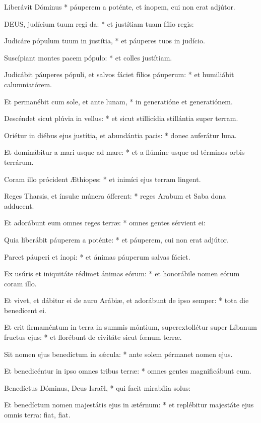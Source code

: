
 Liberávit Dóminus * páuperem a poténte, et ínopem, cui non erat adjútor.


\lettrine[lines=2]{D}{EUS}, judícium tuum regi da: * et justítiam tuam fílio regis:

Judicáre pópulum tuum in justítia, * et páuperes tuos in judício.

Suscípiant montes pacem pópulo: * et colles justítiam.

Judicábit páuperes pópuli, et salvos fáciet fílios páuperum: * et humiliábit calumniatórem.

Et permanébit cum sole, et ante lunam, * in generatióne et generatiónem.

Descéndet sicut plúvia in vellus: * et sicut stillicídia stillántia super terram.

Oriétur in diébus ejus justítia, et abundántia pacis: * donec auferátur luna.

Et dominábitur a mari usque ad mare: * et a flúmine usque ad términos orbis terrárum.

Coram illo prócident Æthíopes: * et inimíci ejus terram lingent.

Reges Tharsis, et ínsulæ múnera ófferent: * reges Arabum et Saba dona adducent.

Et adorábunt eum omnes reges terræ: * omnes gentes sérvient ei:

Quia liberábit páuperem a poténte: * et páuperem, cui non erat adjútor.

Parcet páuperi et ínopi: * et ánimas páuperum salvas fáciet.

Ex usúris et iniquitáte rédimet ánimas eórum: * et honorábile nomen eórum coram illo.

Et vivet, et dábitur ei de auro Arábiæ, et adorábunt de ipso semper: * tota die benedícent ei.

Et erit firmaméntum in terra in summis móntium, superextollétur super Líbanum fructus ejus: * et florébunt de civitáte sicut fœnum terræ.

Sit nomen ejus benedíctum in sǽcula: * ante solem pérmanet nomen ejus.

Et benedicéntur in ipso omnes tribus terræ: * omnes gentes magnificábunt eum.

Benedíctus Dóminus, Deus Israël, * qui facit mirabília solus:

Et benedíctum nomen majestátis ejus in ætérnum: * et replébitur majestáte ejus omnis terra: fiat, fiat.

